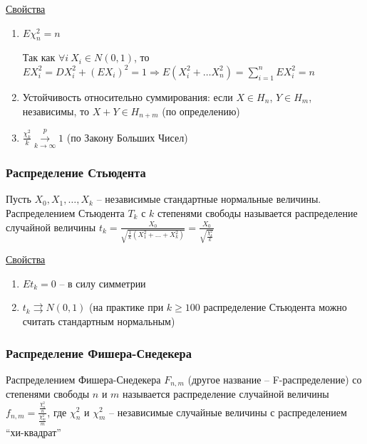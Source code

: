 \underline{Свойства}

\begin{enumerate}
    \item $E\chi^2_n = n$

    \begin{MyProof}
        Так как $\forall i \ X_i \in N(0, 1)$, то $E X_i^2 = D X_i^2 + (EX_i)^2 = 1 \Longrightarrow E(X_i^2 + \dots X_n^2) = \sum_{i = 1}^n E X_i^2 = n$
    \end{MyProof}

    \item Устойчивость относительно суммирования: если $X \in H_n$, $Y \in H_m$, независимы, то $X + Y \in H_{n + m}$ (по определению) 


    \item $\frac{\chi_k^2}{k} \overset{p}{\underset{k \to \infty}{\longrightarrow}} 1$ (по Закону Больших Чисел)
\end{enumerate}

\subsubsection{Распределение Стьюдента}

\Def Пусть $X_0, X_1, \dots, X_k$ -- независимые стандартные нормальные величины. 
Распределением Стьюдента $T_k$ с $k$ степенями свободы называется распределение случайной величины 
$t_k = \frac{X_0}{\sqrt{\frac{1}{k} (X_1^2 + \dots + X_k^2)}} = \frac{X_0}{\sqrt{\frac{\chi_k^2}{k}}}$

\underline{Свойства}

\begin{enumerate}
    \item $Et_k = 0$ -- в силу симметрии

    \item $t_k \rightrightarrows N(0, 1)$ (на практике при $k \geq 100$ распределение Стьюдента можно считать стандартным нормальным)
\end{enumerate}

\subsubsection{Распределение Фишера-Снедекера}

\Def Распределением Фишера-Снедекера $F_{n,m}$ (другое название -- F-распределение) со степенями свободы $n$ и $m$ называется распределение случайной величины 
$f_{n,m} = \frac{\frac{\chi^2_n}{n}}{\frac{\chi^2_m}{m}}$, где $\chi_n^2$ и $\chi_m^2$ -- независимые случайные величины с распределением \enquote{хи-квадрат}

